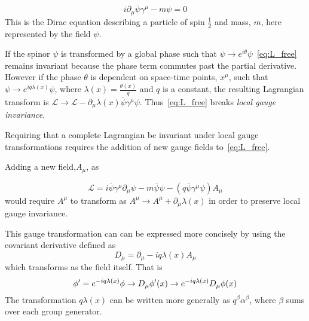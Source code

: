 \begin{equation}
 i\partial_{\mu}\overline{\psi}\gamma^{\mu} -  m\psi = 0
\end{equation}
This is the Dirac equation describing a particle of spin $\frac{1}{2}$ and mass, $m$, here represented by the field $\psi$. 

If the spinor $\psi$ is transformed by a global phase such that $\psi \to e^{i\theta}\psi$~\autoref{eq:L_free} remains invariant because the phase term commutes past the partial derivative. However if the phase $\theta$ is dependent on space-time points, $x^{\mu}$, such that $\psi \to e^{iq\lambda(x)}\psi$, where $\lambda(x) = \frac{\theta(x)}{q}$ and $q$ is a constant, the resulting Lagrangian transform is $\mathcal{L} \to \mathcal{L} - \partial_{\mu}\lambda(x)\overline{\psi}\gamma^{\mu}\psi$. Thus~\autoref{eq:L_free} breaks \emph{local gauge invariance}.

Requiring that a complete Lagrangian be invariant under local gauge transformations requires the addition of new gauge fields to~\autoref{eq:L_free}.

Adding a new field,$A_{\mu}$, as

\begin{equation}
  \label{eq:L_free}
  \mathcal{L} = i\overline{\psi}\gamma^{\mu}\partial_{\mu}\psi - m\overline{\psi}\psi - (q\overline{\psi}\gamma^{\mu}\psi)A_{\mu}
\end{equation}
would require $A^{\mu}$ to transform as $A^{\mu} \to A^{\mu} + \partial_{\mu}\lambda(x)$ in order to preserve local gauge invariance.

This gauge transformation can can be expressed more concisely by using the covariant derivative defined as
\begin{equation}
 D_{\mu} = \partial_{\mu} - iq\lambda(x)A_{\mu}
\end{equation}
which transforms as the field itself.
That is %
\begin{equation}
  \phi^\prime  = e^{-iq\lambda(x)}\phi\\
  \rightarrow D_{\mu}\phi^\prime(x) \to e^{-iq\lambda(x)}D_{\mu}\phi(x)
\end{equation}
The transformation $q\lambda(x)$ can be written more generally as $q^{\beta}\alpha^{\beta}$, where $\beta$ sums over each group generator.

